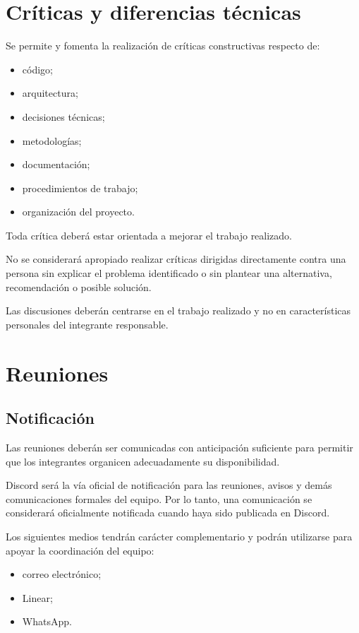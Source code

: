 \documentclass[12pt,a4paper]{article}
\begin{document}
\section{Críticas y diferencias técnicas}

Se permite y fomenta la realización de críticas constructivas respecto de:

\begin{itemize}
    \item código;
    \item arquitectura;
    \item decisiones técnicas;
    \item metodologías;
    \item documentación;
    \item procedimientos de trabajo;
    \item organización del proyecto.
\end{itemize}

Toda crítica deberá estar orientada a mejorar el trabajo realizado.

No se considerará apropiado realizar críticas dirigidas directamente contra una persona sin explicar el problema identificado o sin plantear una alternativa, recomendación o posible solución.

Las discusiones deberán centrarse en el trabajo realizado y no en características personales del integrante responsable.

\section{Reuniones}

\subsection{Notificación}

Las reuniones deberán ser comunicadas con anticipación suficiente para permitir que los integrantes organicen adecuadamente su disponibilidad.

Discord será la vía oficial de notificación para las reuniones, avisos y demás
comunicaciones formales del equipo. Por lo tanto, una comunicación se
considerará oficialmente notificada cuando haya sido publicada en Discord.

Los siguientes medios tendrán carácter complementario y podrán utilizarse
para apoyar la coordinación del equipo:

\begin{itemize}
    \item correo electrónico;
    \item Linear;
    \item WhatsApp.
\end{itemize}
\end{document}
